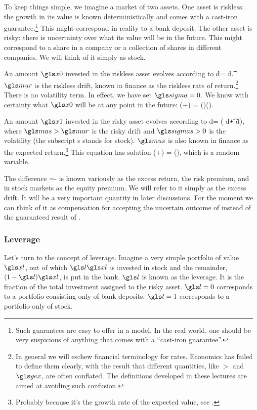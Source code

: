 To keep things simple, we imagine a market of two assets. One asset is riskless: the growth in its value is known deterministically and comes with a cast-iron guarantee.\footnote{Such guarantees are easy to offer in a model. In the real world, one should be very suspicious of anything that comes with a ``cast-iron guarantee''.} This might correspond in reality to a bank deposit. The other asset is risky: there is uncertainty over what its value will be in the future. This might correspond to a share in a company or a collection of shares in different companies. We will think of it simply as stock.

An amount $\xzero$ invested in the riskless asset evolves according to
\be
d\xzero = \xzero \mur d\t.
\ee
$\mur$ is the riskless drift, known in finance as the riskless rate of return.\footnote{In general we will eschew financial terminology for rates. Economics has failed to define them clearly, with the result that different quantities, like $\gt$ and $\gex$, are often conflated. The definitions developed in these lectures are aimed at avoiding such confusion.} There is no volatility term. In effect, we have set $\gsigma=0$. We know with certainty what $\xzero$ will be at any point in the future: 
\be
\xzero(\tn+\Dt) = \xzero(\tn)\exp(\mur\Dt).
\ee

An amount $\xone$ invested in the risky asset evolves according to
\be
d\xone = \xone ( \mus d\t + \sigmas d\gW ),
\ee
where $\mus>\mur$ is the risky drift and $\sigmas>0$ is the volatility (the subscript s stands for stock). $\mus$ is also known in finance as the expected return.\footnote{Probably because it's the growth rate of the expected value, see .} This equation has solution
\be
\xone(\tn+\Dt) = \xone(\tn)\exp{},
\ee
which is a random variable.

The difference
\be
\mue=\mus-\mur
{}
\ee
is known variously as the excess return, the risk premium, and in stock markets as the equity premium. We will refer to it simply as the excess drift. It will be a very important quantity in later discussions. For the moment we can think of it as compensation for accepting the uncertain outcome of  instead of the guaranteed result of .

\subsubsection{Leverage}
Let's turn to the concept of leverage. Imagine a very simple portfolio of value $\xl$, out of which $\l \xl$ is invested in stock and the remainder, $(1-\l)\xl$, is put in the bank. $\l$ is known as the leverage. It is the fraction of the total investment assigned to the risky asset. $\l=0$ corresponds to a portfolio consisting only of bank deposits. $\l=1$ corresponds to a portfolio only of stock.

